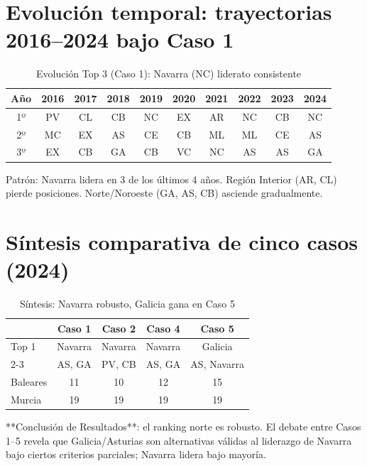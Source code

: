 \section{Evolución temporal: trayectorias 2016--2024 bajo Caso 1}

\begin{table}[H]
    \centering
    \small
    \begin{tabular}{cccccccccc}
        \toprule
        \textbf{Año} & \textbf{2016} & \textbf{2017} & \textbf{2018} & \textbf{2019} & \textbf{2020} & \textbf{2021} & \textbf{2022} & \textbf{2023} & \textbf{2024} \\
        \midrule
        1º & PV & CL & CB & NC & EX & AR & NC & CB & NC \\
        2º & MC & EX & AS & CE & CB & ML & ML & CE & AS \\
        3º & EX & CB & GA & CB & VC & NC & AS & AS & GA \\
        \bottomrule
    \end{tabular}
    \caption{Evolución Top 3 (Caso 1): Navarra (NC) liderato consistente}
\end{table}

Patrón: Navarra lidera en 3 de los últimos 4 años. Región Interior (AR, CL) pierde posiciones. Norte/Noroeste (GA, AS, CB) asciende gradualmente.

\section{Síntesis comparativa de cinco casos (2024)}

\begin{table}[H]
    \centering
    \footnotesize
    \begin{tabular}{lcccc}
        \toprule
        & \textbf{Caso 1} & \textbf{Caso 2} & \textbf{Caso 4} & \textbf{Caso 5} \\
        \midrule
        Top 1 & Navarra & Navarra & Navarra & Galicia \\
        2-3 & AS, GA & PV, CB & AS, GA & AS, Navarra \\
        Baleares & 11 & 10 & 12 & 15 \\
        Murcia & 19 & 19 & 19 & 19 \\
        \bottomrule
    \end{tabular}
    \caption{Síntesis: Navarra robusto, Galicia gana en Caso 5}
\end{table}

**Conclusión de Resultados**: el ranking norte es robusto. El debate entre Casos 1--5 revela que Galicia/Asturias son alternativas válidas al liderazgo de Navarra bajo ciertos criterios parciales; Navarra lidera bajo mayoría.


